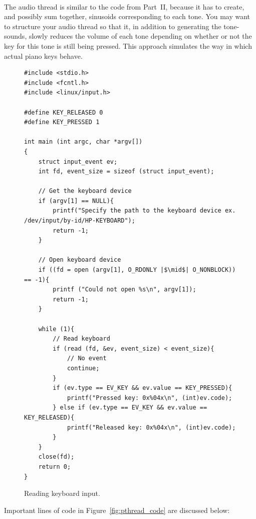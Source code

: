 \documentclass[epsfig,10pt,fullpage]{article}
\begin{document}
~\\
\noindent
The audio thread is similar to the code from
Part~II, because it has to create, and possibly sum together, sinusoids corresponding to
each tone. You may want to structure your audio thread so that it, in addition to generating
the tone-sounds, slowly reduces the volume of each tone depending on whether or not the
key for this tone is still being pressed. This approach simulates the way in which actual piano
keys behave.

\lstset{language=C,numbers=left}
\begin{figure}[H]
\begin{center}
\begin{minipage}[t]{14 cm}
\begin{lstlisting}
#include <stdio.h>
#include <fcntl.h>
#include <linux/input.h>

#define KEY_RELEASED 0
#define KEY_PRESSED 1

int main (int argc, char *argv[])
{
	struct input_event ev;
	int fd, event_size = sizeof (struct input_event);

	// Get the keyboard device 
	if (argv[1] == NULL){
	    printf("Specify the path to the keyboard device ex. /dev/input/by-id/HP-KEYBOARD");
	    return -1;
	}
 
	// Open keyboard device
	if ((fd = open (argv[1], O_RDONLY |$\mid$| O_NONBLOCK)) == -1){
	    printf ("Could not open %s\n", argv[1]);
	    return -1;
	}

	while (1){
	    // Read keyboard
	    if (read (fd, &ev, event_size) < event_size){
	        // No event
	        continue;
	    }
	    if (ev.type == EV_KEY && ev.value == KEY_PRESSED){
	        printf("Pressed key: 0x%04x\n", (int)ev.code);
	    } else if (ev.type == EV_KEY && ev.value == KEY_RELEASED){
	        printf("Released key: 0x%04x\n", (int)ev.code);
	    }
	}
	close(fd);
	return 0;
}
\end{lstlisting}
\end{minipage}
\end{center}
\vspace{-0.33in}\caption{Reading keyboard input.}
\label{fig:keyboard_code}
\end{figure}

Important lines of code in Figure~\ref{fig:pthread_code} are discussed below:
\end{document}
